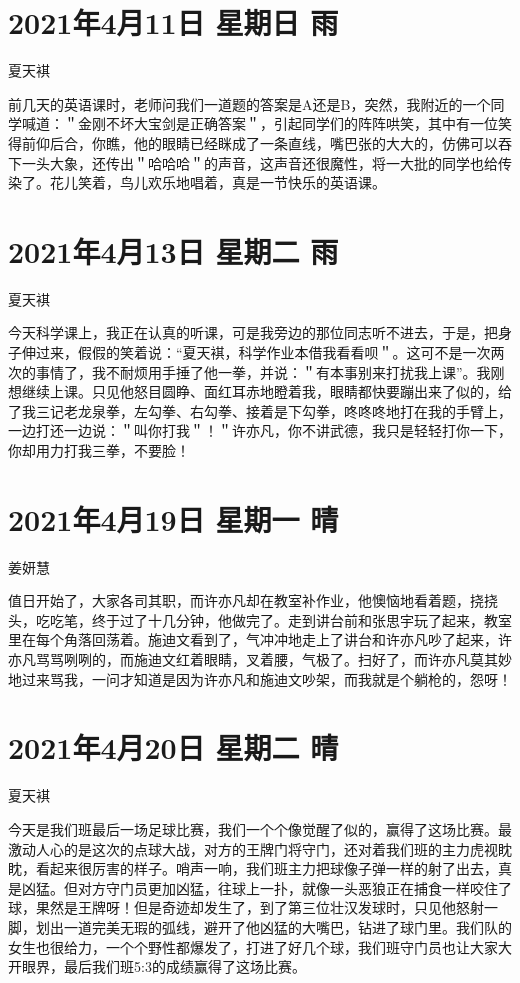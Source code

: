\section{2021年4月11日 星期日 雨}

夏天褀

前几天的英语课时，老师问我们一道题的答案是A还是B，突然，我附近的一个同学喊道：＂金刚不坏大宝剑是正确答案＂，引起同学们的阵阵哄笑，其中有一位笑得前仰后合，你瞧，他的眼睛已经眯成了一条直线，嘴巴张的大大的，仿佛可以吞下一头大象，还传出＂哈哈哈＂的声音，这声音还很魔性，将一大批的同学也给传染了。花儿笑着，鸟儿欢乐地唱着，真是一节快乐的英语课。

\section{2021年4月13日 星期二 雨}

夏天褀

今天科学课上，我正在认真的听课，可是我旁边的那位同志听不进去，于是，把身子伸过来，假假的笑着说：``夏天褀，科学作业本借我看看呗＂。这可不是一次两次的事情了，我不耐烦用手捶了他一拳，并说：＂有本事别来打扰我上课''。我刚想继续上课。只见他怒目圆睁、面红耳赤地瞪着我，眼睛都快要蹦出来了似的，给了我三记老龙泉拳，左勾拳、右勾拳、接着是下勾拳，咚咚咚地打在我的手臂上，一边打还一边说：＂叫你打我＂！＂许亦凡，你不讲武德，我只是轻轻打你一下，你却用力打我三拳，不要脸！

\section{2021年4月19日 星期一 晴}

姜妍慧

值日开始了，大家各司其职，而许亦凡却在教室补作业，他懊恼地看着题，挠挠头，吃吃笔，终于过了十几分钟，他做完了。走到讲台前和张思宇玩了起来，教室里在每个角落回荡着。施迪文看到了，气冲冲地走上了讲台和许亦凡吵了起来，许亦凡骂骂咧咧的，而施迪文红着眼睛，叉着腰，气极了。扫好了，而许亦凡莫其妙地过来骂我，一问才知道是因为许亦凡和施迪文吵架，而我就是个躺枪的，怨呀！

\section{2021年4月20日 星期二 晴}

夏天褀

今天是我们班最后一场足球比赛，我们一个个像觉醒了似的，赢得了这场比赛。最激动人心的是这次的点球大战，对方的王牌门将守门，还对着我们班的主力虎视眈眈，看起来很厉害的样子。哨声一响，我们班主力把球像子弹一样的射了出去，真是凶猛。但对方守门员更加凶猛，往球上一扑，就像一头恶狼正在捕食一样咬住了球，果然是王牌呀！但是奇迹却发生了，到了第三位壮汉发球时，只见他怒射一脚，划出一道完美无瑕的弧线，避开了他凶猛的大嘴巴，钻进了球门里。我们队的女生也很给力，一个个野性都爆发了，打进了好几个球，我们班守门员也让大家大开眼界，最后我们班5:3的成绩赢得了这场比赛。

